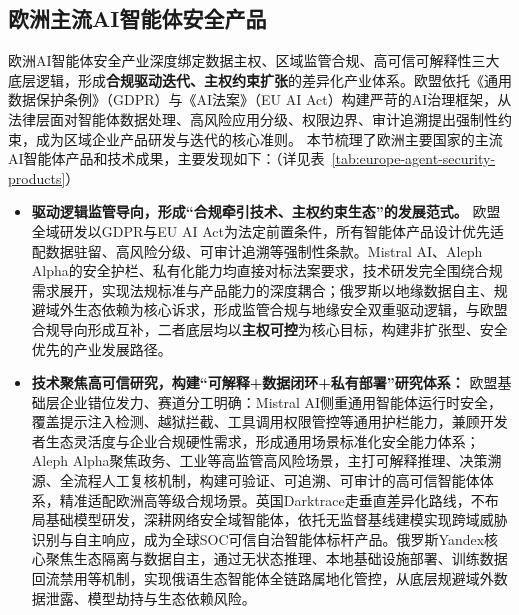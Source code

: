 \subsection{欧洲主流AI智能体安全产品}
欧洲AI智能体安全产业深度绑定数据主权、区域监管合规、高可信可解释性三大底层逻辑，形成\textbf{合规驱动迭代、主权约束扩张}的差异化产业体系\cite{alephphariaaipdf2025,mistralaistudio2025}。欧盟依托《通用数据保护条例》（GDPR）与《AI法案》（EU AI Act）构建严苛的AI治理框架，从法律层面对智能体数据处理、高风险应用分级、权限边界、审计追溯提出强制性约束，成为区域企业产品研发与迭代的核心准则\cite{alephintelligencelayer2026}。
%
本节梳理了欧洲主要国家的主流AI智能体产品和技术成果，主要发现如下：（详见表~\ref{tab:europe-agent-security-products}）
\begin{itemize}[tabitem]
    \item \textbf{驱动逻辑监管导向，形成“合规牵引技术、主权约束生态”的发展范式。}
    欧盟全域研发以GDPR与EU AI Act为法定前置条件，所有智能体产品设计优先适配数据驻留、高风险分级、可审计追溯等强制性条款\cite{alephphariaaipdf2025}。Mistral AI、Aleph Alpha的安全护栏、私有化能力均直接对标法案要求，技术研发完全围绕合规需求展开，实现法规标准与产品能力的深度耦合\cite{mistralforge2026,alephphariamodels2026}；俄罗斯以地缘数据自主、规避域外生态依赖为核心诉求，形成监管合规与地缘安全双重驱动逻辑，与欧盟合规导向形成互补，二者底层均以\textbf{主权可控}为核心目标，构建非扩张型、安全优先的产业发展路径\cite{yandexaistudiosecurity2026}。

    \item \textbf{技术聚焦高可信研究，构建“可解释+数据闭环+私有部署”研究体系：}
    欧盟基础层企业错位发力、赛道分工明确：Mistral AI侧重通用智能体运行时安全，覆盖提示注入检测、越狱拦截、工具调用权限管控等通用护栏能力，兼顾开发者生态灵活度与企业合规硬性需求，形成通用场景标准化安全能力体系\cite{mistralagentsapi2025,mistralstudio2026}；Aleph Alpha聚焦政务、工业等高监管高风险场景，主打可解释推理、决策溯源、全流程人工复核机制，构建可验证、可追溯、可审计的高可信智能体体系，精准适配欧洲高等级合规场景\cite{alephphariaai2026,alephintelligencelayer2026}。英国Darktrace走垂直差异化路线，不布局基础模型研发，深耕网络安全域智能体，依托无监督基线建模实现跨域威胁识别与自主响应，成为全球SOC可信自治智能体标杆产品\cite{darktraceactiveai2026,darktracecyberanalyst2026}。俄罗斯Yandex核心聚焦生态隔离与数据自主，通过无状态推理、本地基础设施部署、训练数据回流禁用等机制，实现俄语生态智能体全链路属地化管控，从底层规避域外数据泄露、模型劫持与生态依赖风险\cite{yandexaistudioonprem2026,yandexaisearch2026}。


\end{itemize}
